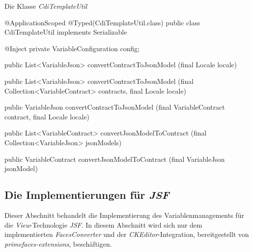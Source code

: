 \begin{program}[h]
\caption{Die Klasse \emph{CdiTemplateUtil}}
\label{prog:cdiTemplateUtil}
\begin{JavaCode}
@ApplicationScoped
@Typed(CdiTemplateUtil.class)
public class CdiTemplateUtil implements Serializable {

    @Inject
    private VariableConfiguration config;

    public List<VariableJson> convertContractToJsonModel
    						  (final Locale locale) { }

    public List<VariableJson> convertContractToJsonModel
    		(final Collection<VariableContract> contracts,
             final Locale locale) { }

    public VariableJson convertContractToJsonModel
           (final VariableContract contract,
            final Locale locale) { }
	
    public List<VariableContract> convertJsonModelToContract
    							 (final Collection<VariableJson> jsonModels) { }

    public VariableContract convertJsonModelToContract
                            (final VariableJson jsonModel) { }
}
\end{JavaCode}
\end{program}

\subsection{Die Implementierungen für \emph{JSF}}
\label{sec:sub-impl-integartion-jsf}
Dieser Abschnitt behandelt die Implementierung des Variablenmanagements für die \emph{View}-Technologie \emph{JSF}. In diesem Abschnitt wird sich nur dem implementierten \emph{FacesConverter} und der \emph{CKEditor}-Integration, bereitgestellt von \emph{primefaces-extensions}, beschäftigen.

